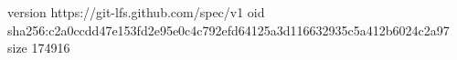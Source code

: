 version https://git-lfs.github.com/spec/v1
oid sha256:c2a0ccdd47e153fd2e95e0c4c792efd64125a3d116632935c5a412b6024c2a97
size 174916
